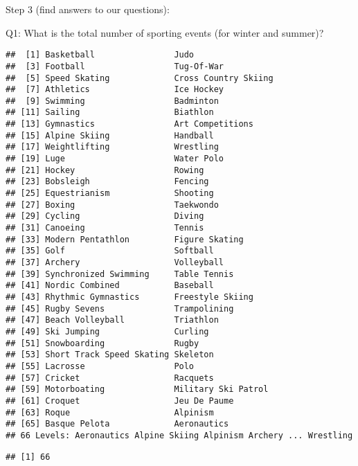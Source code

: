 \documentclass[
  ignorenonframetext,
]{beamer}
\begin{document}
\begin{frame}[fragile]{Step 3 (find answers to our questions):}
\protect\hypertarget{step-3-find-answers-to-our-questions}{}
\begin{block}{Q1: What is the total number of sporting events (for
winter and summer)?}
\protect\hypertarget{q1-what-is-the-total-number-of-sporting-events-for-winter-and-summer}{}
\begin{verbatim}
##  [1] Basketball                Judo                     
##  [3] Football                  Tug-Of-War               
##  [5] Speed Skating             Cross Country Skiing     
##  [7] Athletics                 Ice Hockey               
##  [9] Swimming                  Badminton                
## [11] Sailing                   Biathlon                 
## [13] Gymnastics                Art Competitions         
## [15] Alpine Skiing             Handball                 
## [17] Weightlifting             Wrestling                
## [19] Luge                      Water Polo               
## [21] Hockey                    Rowing                   
## [23] Bobsleigh                 Fencing                  
## [25] Equestrianism             Shooting                 
## [27] Boxing                    Taekwondo                
## [29] Cycling                   Diving                   
## [31] Canoeing                  Tennis                   
## [33] Modern Pentathlon         Figure Skating           
## [35] Golf                      Softball                 
## [37] Archery                   Volleyball               
## [39] Synchronized Swimming     Table Tennis             
## [41] Nordic Combined           Baseball                 
## [43] Rhythmic Gymnastics       Freestyle Skiing         
## [45] Rugby Sevens              Trampolining             
## [47] Beach Volleyball          Triathlon                
## [49] Ski Jumping               Curling                  
## [51] Snowboarding              Rugby                    
## [53] Short Track Speed Skating Skeleton                 
## [55] Lacrosse                  Polo                     
## [57] Cricket                   Racquets                 
## [59] Motorboating              Military Ski Patrol      
## [61] Croquet                   Jeu De Paume             
## [63] Roque                     Alpinism                 
## [65] Basque Pelota             Aeronautics              
## 66 Levels: Aeronautics Alpine Skiing Alpinism Archery ... Wrestling
\end{verbatim}

\begin{verbatim}
## [1] 66
\end{verbatim}
\end{block}


\end{frame}
\end{document}
